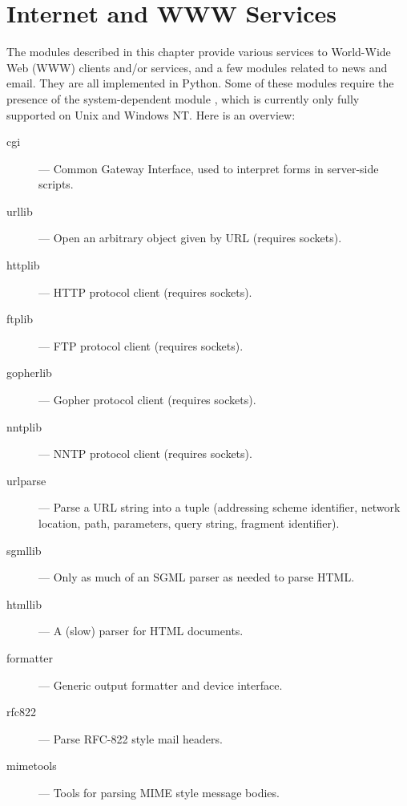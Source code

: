 \chapter{Internet and WWW Services}

The modules described in this chapter provide various services to
World-Wide Web (WWW) clients and/or services, and a few modules
related to news and email.  They are all implemented in Python.  Some
of these modules require the presence of the system-dependent module
, which is currently only fully supported on Unix and
Windows NT.  Here is an overview:

\begin{description}

\item[cgi]
--- Common Gateway Interface, used to interpret forms in server-side
scripts.

\item[urllib]
--- Open an arbitrary object given by URL (requires sockets).

\item[httplib]
--- HTTP protocol client (requires sockets).

\item[ftplib]
--- FTP protocol client (requires sockets).

\item[gopherlib]
--- Gopher protocol client (requires sockets).

\item[nntplib]
--- NNTP protocol client (requires sockets).

\item[urlparse]
--- Parse a URL string into a tuple (addressing scheme identifier, network
location, path, parameters, query string, fragment identifier).

\item[sgmllib]
--- Only as much of an SGML parser as needed to parse HTML.

\item[htmllib]
--- A (slow) parser for HTML documents.

\item[formatter]
--- Generic output formatter and device interface.

\item[rfc822]
--- Parse RFC-822 style mail headers.

\item[mimetools]
--- Tools for parsing MIME style message bodies.


\end{description}
